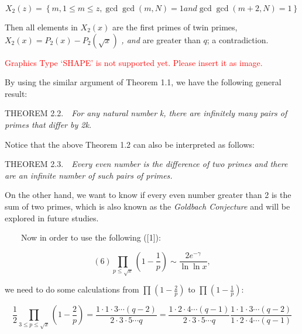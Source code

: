 \documentclass{article}
\begin{document}
\begin{equation}
X_{2}\left(z\right) =\left\{  m,  1\leq m\leq z,  \gcd \gcd \left(m,N\right)  = 1  and \gcd \gcd \left(m+2,N\right)  = 1\right\} 
\end{equation}

\vspace{1\baselineskip}

Then all elements in \( X_{2}\left(x\right)\) are the first primes of twin primes,  \( X_{2}\left(x\right) = P_{2}\left(x\right)- P_{2}\left(\sqrt{x}\right)\)\textit{ {,  } {and }}are greater than \( q\); a contradiction. \ \ 

\vspace{1\baselineskip}

\textcolor{red}{Graphics Type `SHAPE' is not supported yet. Please insert it as image.}\par


By using the similar argument of Theorem 1.1, we have the following general result:
\vspace{1\baselineskip}

THEOREM  2.2.\ \ \textit{For any natural number} \textit{k, there are infinitely many pairs of primes that differ by 2k.}

Notice that the above Theorem 1.2 can also be interpreted as follows: 
\vspace{1\baselineskip}

THEOREM  2.3.\ \ \textit{Every even number is the difference of two primes and there are an infinite number of such pairs of primes.\textcolor[HTML]{FFFFFF}{ }}

On the other hand, we want to know if every even number greater than 2 is the sum of two primes, which is also known as the \textit{Goldbach Conjecture} and will be explored in future studies. 

\vspace{1\baselineskip}

 \ \ \ \ Now in order to use the following ([1]):

\begin{equation}
 (6)                                    \prod_{p\leq\sqrt{x}}^{}(1-\frac{1}{p} ) \sim  \frac{2e^{-\gamma }}{\ln \ln  x } ,
\end{equation}


 we need to do some calculations from \( \prod_{}^{}(1-\frac{2}{p} )\) { to }\( \prod_{}^{}(1-\frac{1}{p} )\):

\begin{equation}
\frac{1}{2} \prod_{3\leq p\leq\sqrt{x}}^{}(1-\frac{2}{p} ) = \frac{1\cdot 1\cdot 3\cdots (q-2)}{2\cdot 3\cdot 5\cdots q} = \frac{1\cdot 2\cdot 4\cdots (q-1)}{2\cdot 3\cdot 5\cdots q}\frac{1\cdot 1\cdot 3\cdots (q-2)}{1\cdot 2\cdot 4\cdots (q-1)} 
\end{equation}
\end{document}
